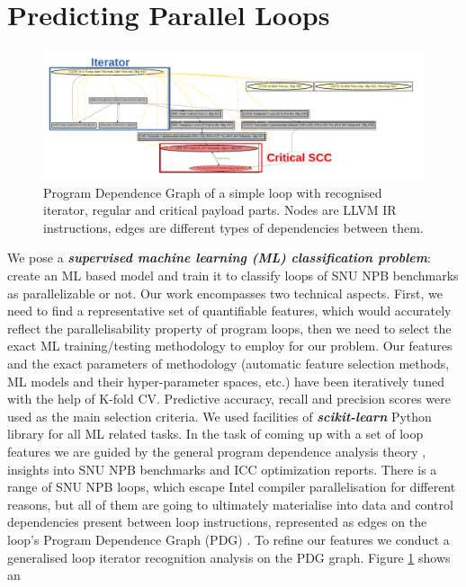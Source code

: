 \documentclass{acaces}
\begin{document}
\section{Predicting Parallel Loops}
\label{predicting_parallel_loops}
\begin{figure}
	\centering
	\includegraphics[width=1.0\textwidth]{pdg_example}
	\caption{Program Dependence Graph of a simple loop with recognised iterator, regular and critical payload parts. Nodes are LLVM IR instructions, edges are different types of dependencies between them.}
	\label{fig:pdg}
\end{figure}
\quad We pose a \textit{\textbf{supervised machine learning (ML) classification problem}}: create an ML based model and train it to classify loops of SNU NPB benchmarks as parallelizable or not. Our work encompasses two technical aspects. First, we need to find a representative set of quantifiable features, which would accurately reflect the parallelisability property of program loops, then we need to select the exact ML training/testing methodology to employ for our problem. Our features and the exact parameters of methodology (automatic feature selection methods, ML models and their hyper-parameter spaces, etc.) have been iteratively tuned with the help of K-fold CV. Predictive accuracy, recall and precision scores were used as the main selection criteria. We used facilities of \textbf{\textit{scikit-learn}} Python library for all ML related tasks.\newline\null
\quad In the task of coming up with a set of loop features we are guided by the general program dependence analysis theory \cite{Kennedy:2001:OCM:502981}, insights into SNU NPB benchmarks and ICC optimization reports. There is a range of SNU NPB loops, which escape Intel compiler parallelisation for different reasons, but all of them are going to ultimately materialise into data and control dependencies present between loop instructions, represented as edges on the loop's Program Dependence Graph (PDG) \cite{Ferrante:1987:PDG:24039.24041}. To refine our features we conduct a generalised loop iterator recognition \cite{Manilov:2018:GPI:3178372.3179511} analysis on the PDG graph. Figure \ref{fig:pdg} shows an
\end{document}

